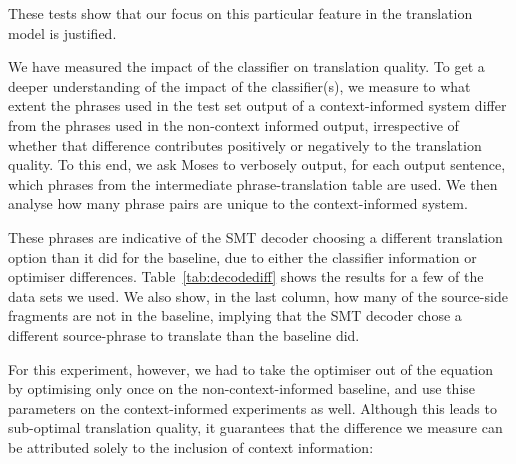 These tests show that our focus on this particular feature in the
translation model is justified.


We have measured the impact of the classifier on translation quality.  To get a
deeper understanding of the impact of the classifier(s), we measure to what
extent the phrases used in the test set output of a context-informed system
differ from the phrases used in the non-context informed output, irrespective
of whether that difference contributes positively or negatively to the
translation quality. To this end, we ask Moses to verbosely output, for each
output sentence, which phrases from the intermediate phrase-translation table
are used. We then analyse how many phrase pairs are unique to the
context-informed system.

These phrases are indicative of the SMT decoder
choosing a different translation option than it did for the baseline, due to
either the classifier information or optimiser differences.
Table~\ref{tab:decodediff} shows the results for a few of the data sets we
used. We also show, in the last column, how many of the source-side fragments
are not in the baseline, implying that the SMT decoder chose a different
source-phrase to translate than the baseline did.

For this experiment, however, we had to take the optimiser out of the equation
by optimising only once on the non-context-informed baseline, and use thise
parameters on the context-informed experiments as well. Although this leads to
sub-optimal translation quality, it guarantees that the difference we measure
can be attributed solely to the inclusion of context information:


